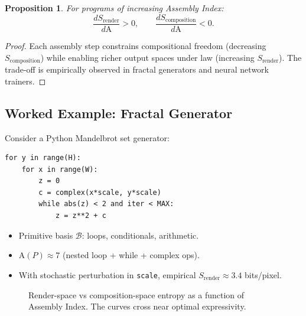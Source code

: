 \documentclass[12pt,a4paper]{article}
\theoremstyle{plain}
\newtheorem{proposition}[theorem]{Proposition}
\theoremstyle{definition}
\theoremstyle{remark}
\newcommand{\Sfield}{S}
\newcommand{\AI}{\mathrm{A}}
\begin{document}
\begin{proposition}
For programs of increasing Assembly Index:
\[
\frac{d \Sfield_\mathrm{render}}{d \AI} > 0, \qquad
\frac{d \Sfield_\mathrm{composition}}{d \AI} < 0.
\]
\end{proposition}

\begin{proof}
Each assembly step constrains compositional freedom (decreasing $\Sfield_\mathrm{composition}$) while enabling richer output spaces under law (increasing $\Sfield_\mathrm{render}$). The trade-off is empirically observed in fractal generators and neural network trainers.
\end{proof}

\subsection{Worked Example: Fractal Generator}
Consider a Python Mandelbrot set generator:
\begin{verbatim}
for y in range(H):
    for x in range(W):
        z = 0
        c = complex(x*scale, y*scale)
        while abs(z) < 2 and iter < MAX:
            z = z**2 + c
\end{verbatim}

\begin{itemize}
    \item Primitive basis $\mathcal{B}$: loops, conditionals, arithmetic.
    \item $\AI(P) \approx 7$ (nested loop + while + complex ops).
    \item With stochastic perturbation in \texttt{scale}, empirical $\Sfield_\mathrm{render} \approx 3.4$ bits/pixel.
\end{itemize}

\begin{figure}[H]
\centering
{}
\caption{Render-space vs composition-space entropy as a function of Assembly Index. The curves cross near optimal expressivity.}
\label{fig:entropy-crossing}
\end{figure}
\end{document}
